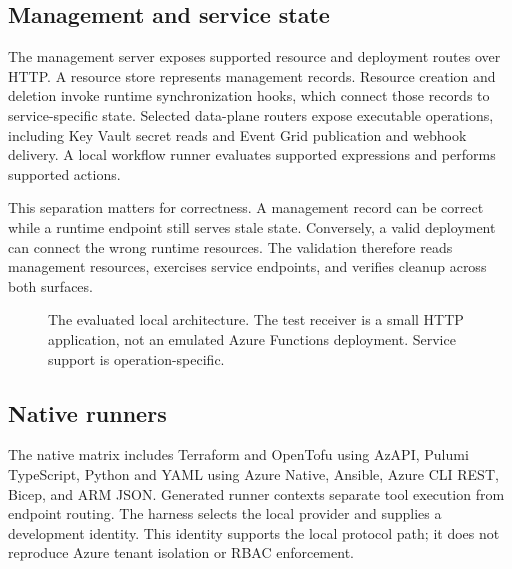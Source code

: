 \documentclass[10pt,a4paper]{article}
\begin{document}
\subsection{Management and service state}
The management server exposes supported resource and deployment routes over HTTP. A resource store represents management records. Resource creation and deletion invoke runtime synchronization hooks, which connect those records to service-specific state. Selected data-plane routers expose executable operations, including Key Vault secret reads and Event Grid publication and webhook delivery. A local workflow runner evaluates supported expressions and performs supported actions.

This separation matters for correctness. A management record can be correct while a runtime endpoint still serves stale state. Conversely, a valid deployment can connect the wrong runtime resources. The validation therefore reads management resources, exercises service endpoints, and verifies cleanup across both surfaces.

\begin{figure}[ht]
\centering
{}
\caption{The evaluated local architecture. The test receiver is a small HTTP application, not an emulated Azure Functions deployment. Service support is operation-specific.}
\end{figure}

\subsection{Native runners}
The native matrix includes Terraform and OpenTofu using AzAPI, Pulumi TypeScript, Python and YAML using Azure Native, Ansible, Azure CLI REST, Bicep, and ARM JSON. Generated runner contexts separate tool execution from endpoint routing. The harness selects the local provider and supplies a development identity. This identity supports the local protocol path; it does not reproduce Azure tenant isolation or RBAC enforcement.
\end{document}

